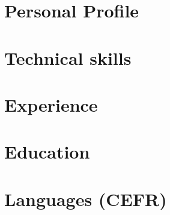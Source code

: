 \documentclass[11pt,a4paper,sans]{moderncv}
\begin{document}
\makecvtitle

\vspace*{-10mm}

\section{Personal Profile}


\section{Technical skills}


\section{Experience}


\section{Education}


\section{Languages (CEFR)}
 
\end{document}
